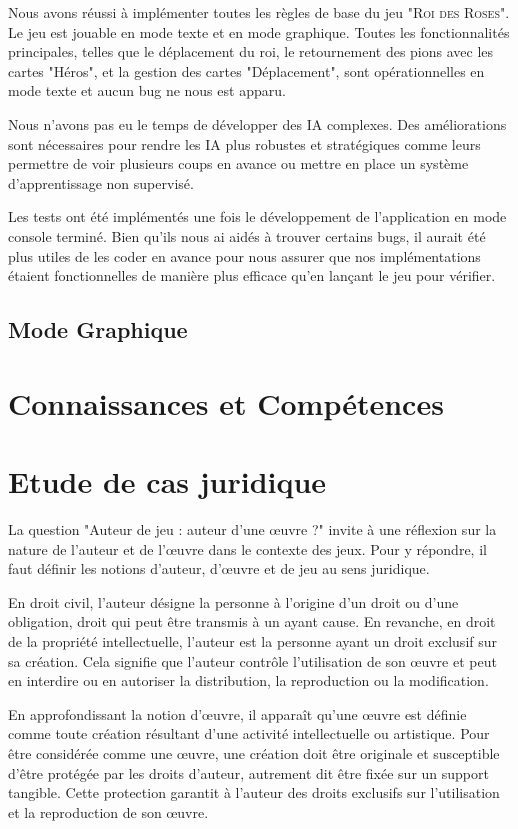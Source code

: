 Nous avons réussi à implémenter toutes les règles de base du jeu "\textsc{Roi des Roses}". Le jeu est jouable en mode texte et en mode graphique. Toutes les fonctionnalités principales, telles que le déplacement du roi, le retournement des pions avec les cartes "Héros", et la gestion des cartes "Déplacement", sont opérationnelles en mode texte et aucun bug ne nous est apparu.

Nous n'avons pas eu le temps de développer des IA complexes. Des améliorations sont nécessaires pour rendre les IA plus robustes et stratégiques comme leurs permettre de voir plusieurs coups en avance ou mettre en place un système d'apprentissage non supervisé.

Les tests ont été implémentés une fois le développement de l'application en mode console terminé. Bien qu'ils nous ai aidés à trouver certains bugs, il aurait été plus utiles de les coder en avance pour nous assurer que nos implémentations étaient fonctionnelles de manière plus efficace qu'en lançant le jeu pour vérifier.

\subsection*{Mode Graphique}

\section{Connaissances et Compétences}

\section{Etude de cas juridique}

La question "Auteur de jeu : auteur d'une œuvre ?" invite à une réflexion sur la nature de l'auteur et de l'œuvre dans le contexte des jeux. Pour y répondre, il faut définir les notions d'auteur, d'œuvre et de jeu au sens juridique.

En droit civil, l'auteur désigne la personne à l'origine d'un droit ou d'une obligation, droit qui peut être transmis à un ayant cause. En revanche, en droit de la propriété intellectuelle, l'auteur est la personne ayant un droit exclusif sur sa création. Cela signifie que l'auteur contrôle l'utilisation de son œuvre et peut en interdire ou en autoriser la distribution, la reproduction ou la modification.

En approfondissant la notion d'œuvre, il apparaît qu'une œuvre est définie comme toute création résultant d'une activité intellectuelle ou artistique. Pour être considérée comme une œuvre, une création doit être originale et susceptible d'être protégée par les droits d'auteur, autrement dit être fixée sur un support tangible. Cette protection garantit à l'auteur des droits exclusifs sur l'utilisation et la reproduction de son œuvre.

